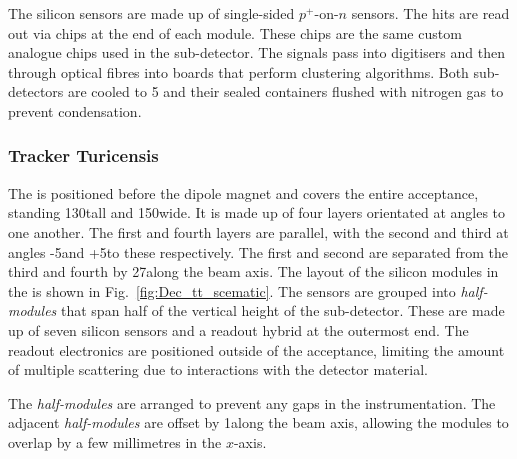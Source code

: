 The silicon sensors are made up of single-sided $p^{+}$-on-$n$ sensors. The hits are read out via chips at the end of each module. These chips are the same custom analogue chips used in the \velo sub-detector. The signals pass into digitisers and then through optical fibres into \tellone boards that perform clustering algorithms.
Both sub-detectors are cooled to 5 and their sealed containers flushed with nitrogen gas to prevent condensation.



\subsubsection{Tracker Turicensis}

The \ttracker is positioned before the dipole magnet and covers the entire \lhcb acceptance, standing 130\cm tall and 150\cm wide.
It is made up of four layers orientated at angles to one another. The first and fourth layers are parallel, with the second and third at angles -5\degrees and +5\degrees to these respectively. The first and second are separated from the third and fourth by 27\cm along the beam axis. The layout of the silicon modules in the \ttracker is shown in Fig.~\ref{fig:Dec_tt_scematic}. The sensors are grouped into \emph{half-modules} that span half of the vertical height of the sub-detector. These are made up of seven silicon sensors and a readout hybrid at the outermost end. The readout electronics are positioned outside of the \lhcb acceptance, limiting the amount of multiple scattering due to interactions with the detector material. 

The \emph{half-modules} are arranged to prevent any gaps in the instrumentation. The adjacent \emph{half-modules} are offset by 1\cm along the beam axis, allowing the modules to overlap by a few millimetres in the $x$-axis. 


